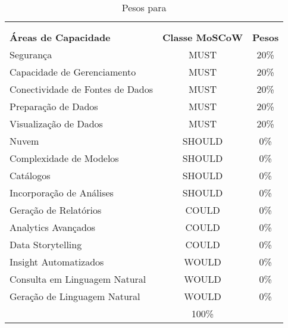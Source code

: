     \begin{table}[!h]
        \begin{center}
        \begin{tabular}{|p{}|c|c|}
            \hline
                \rowcolor{cldfB1} \multicolumn{3}{|c|}{\Large \cenGB} \\  
                \rowcolor{cldfB1}
                \multicolumn{3}{|c|}{\large \textbf{Tabela de Pesos}} \\ \hline \hline
                \rowcolor{lightgray}\textbf{Áreas de Capacidade} & \textbf{Classe MoSCoW} & \textbf{Pesos} \\ \hline
                \rowcolor{corMUST!80}Segurança & MUST & 20\% \\ \hline
                \rowcolor{corMUST!80}Capacidade de Gerenciamento & MUST & 20\% \\ \hline
                \rowcolor{corMUST!80}Conectividade de Fontes de Dados & MUST & 20\% \\ \hline
                \rowcolor{corMUST!80}Preparação de Dados & MUST & 20\% \\ \hline
                \rowcolor{corMUST!80}Visualização de Dados & MUST & 20\% \\ \hline
                \rowcolor{corSHOULD!80}Nuvem & SHOULD & 0\% \\ \hline
                \rowcolor{corSHOULD!80}Complexidade de Modelos & SHOULD & 0\% \\ \hline
                \rowcolor{corSHOULD!80}Catálogos & SHOULD & 0\% \\ \hline
                \rowcolor{corSHOULD!80}Incorporação de Análises & SHOULD & 0\% \\ \hline
                \rowcolor{corCOULD!50}Geração de Relatórios & COULD & 0\% \\ \hline
                \rowcolor{corCOULD!50}Analytics Avançados & COULD & 0\% \\ \hline
                \rowcolor{corCOULD!50}Data Storytelling & COULD & 0\% \\ \hline
                \rowcolor{corWOULD!50}Insight Automatizados & WOULD & 0\% \\ \hline
                \rowcolor{corWOULD!50}Consulta em Linguagem Natural & WOULD & 0\% \\ \hline
                \rowcolor{corWOULD!50}Geração de Linguagem Natural & WOULD & 0\% \\ \hline
                \rowcolor{lightgray!30} \multicolumn{2}{|r|}{\large Total: \normalsize} & 100\% \\ \hline 
        \end{tabular}    
        \caption{\label{tab:cenGB:pesos} Pesos para \cenGB}
        \end{center}
    \end{table}    

